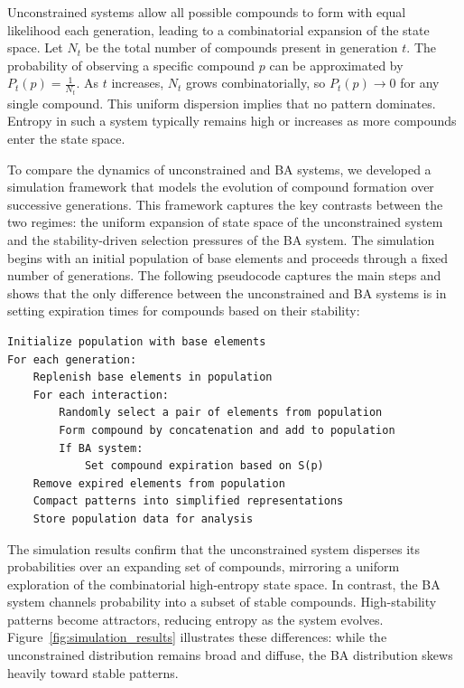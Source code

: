 \documentclass[entropy,article,submit,pdftex,moreauthors]{Definitions/mdpi}
\begin{document}
Unconstrained systems allow all possible compounds to form with equal likelihood each generation, leading to a combinatorial expansion of the state space. Let $N_t$ be the total number of compounds present in generation $t$. The probability of observing a specific compound $p$ can be approximated by $P_t(p) = \frac{1}{N_t}$. As $t$ increases, $N_t$ grows combinatorially, so $P_t(p) \to 0$ for any single compound. This uniform dispersion implies that no pattern dominates. Entropy in such a system typically remains high or increases as more compounds enter the state space.

To compare the dynamics of unconstrained and BA systems, we developed a simulation framework that models the evolution of compound formation over successive generations. This framework captures the key contrasts between the two regimes: the uniform expansion of state space of the unconstrained system and the stability-driven selection pressures of the BA system. The simulation begins with an initial population of base elements and proceeds through a fixed number of generations. The following pseudocode captures the main steps and shows that the only difference between the unconstrained and BA systems is in setting expiration times for compounds based on their stability:

\begin{center}
\begin{minipage}{0.9\textwidth}
\ttfamily
\begin{verbatim}
Initialize population with base elements
For each generation:
    Replenish base elements in population
    For each interaction:
        Randomly select a pair of elements from population
        Form compound by concatenation and add to population
        If BA system:
            Set compound expiration based on S(p)
    Remove expired elements from population
    Compact patterns into simplified representations
    Store population data for analysis
\end{verbatim}
\end{minipage}
\end{center}
The simulation results confirm that the unconstrained system disperses its probabilities over an expanding set of compounds, mirroring a uniform exploration of the combinatorial high-entropy state space. In contrast, the BA system channels probability into a subset of stable compounds. High-stability patterns become attractors, reducing entropy as the system evolves. Figure~\ref{fig:simulation_results} illustrates these differences: while the unconstrained distribution remains broad and diffuse, the BA distribution skews heavily toward stable patterns.
\end{document}
